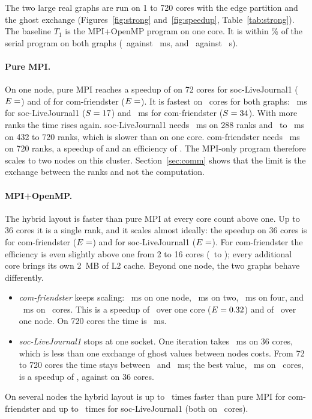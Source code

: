 \documentclass[11pt,a4paper]{article}
\begin{document}
The two large real graphs are run on 1 to 720 cores with the edge partition and the ghost exchange
(Figures~\ref{fig:strong} and~\ref{fig:speedup}, Table~\ref{tab:strong}). The baseline $T_1$ is the MPI+OpenMP
program on one core. It is within \baseLJ\% of the serial program on both graphs (\stLJone\ against \serLJms~ms, and
\stFRones\ against \serFRs~s).

\paragraph{Pure MPI.} On one node, pure MPI reaches a speedup of  on 72 cores for soc-LiveJournal1
($E=\stLJmpE{72}$) and of  for com-friendster ($E=\stFRmpE{72}$). It is fastest on \stLJmpbestc\ cores for
both graphs: \stLJmpbest~ms for soc-LiveJournal1 ($S=17$) and \stFRmpbest~ms for com-friendster
($S=34$). With more ranks the time rises again. soc-LiveJournal1 needs ~ms on 288 ranks and
\stLJmpfast\ to \stLJmpslow~ms on 432 to 720 ranks, which is slower than on one core. com-friendster needs
~ms on 720 ranks, a speedup of  and an efficiency of . The MPI-only program
therefore scales to two nodes on this cluster. Section~\ref{sec:comm} shows that the limit is the exchange between
the ranks and not the computation.

\paragraph{MPI+OpenMP.} The hybrid layout is faster than pure MPI at every core count above one. Up to 36 cores it
is a single rank, and it scales almost ideally: the speedup on 36 cores is  for com-friendster
($E=\stFRhyE{36}$) and  for soc-LiveJournal1 ($E=\stLJhyE{36}$). For com-friendster the efficiency is
even slightly above one from 2 to 16 cores (\stFReffLo\ to \stFReffHi); every additional core brings its own 2~MB
of L2 cache. Beyond one node, the two graphs behave differently.
\begin{itemize}
\item \emph{com-friendster} keeps scaling: ~ms on one node, ~ms on two, ~ms on
  four, and \stFRbest~ms on \stFRbestc\ cores. This is a speedup of \stFRbestS\ over one core ($E=0.32$) and of
  \stFRnodeS\ over one node. On 720 cores the time is ~ms.
\item \emph{soc-LiveJournal1} stops at one socket. One iteration takes ~ms on 36 cores, which is less
  than one exchange of ghost values between nodes costs. From 72 to 720 cores the time stays between \stLJmultimin\
  and \stLJmultimax~ms; the best value, \stLJbest~ms on \stLJbestc\ cores, is a speedup of \stLJbestS, against
  \stLJhyS{36} on 36 cores.
\end{itemize}
On several nodes the hybrid layout is up to \stFRratio\ times faster than pure MPI for com-friendster and up to
\stLJratio\ times for soc-LiveJournal1 (both on \stLJratioc\ cores).
\end{document}
